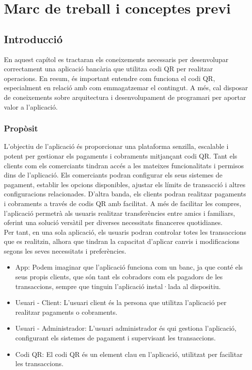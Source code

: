 \documentclass[a4paper,12pt,twoside]{ThesisStyle}
\begin{document}
\chapter{Marc de treball i conceptes previ}
\label{chp:marcdetreball}


\section{Introducció}
\label{subsec:Introducció}

En aquest capítol es tractaran els coneixements necessaris per desenvolupar correctament una aplicació bancària que utilitza codi QR per realitzar operacions. En resum, és important entendre com funciona el codi QR, especialment en relació amb com emmagatzemar el contingut. A més, cal disposar de coneixements sobre arquitectura i desenvolupament de programari per aportar valor a l'aplicació.

\subsection{Propòsit}
\label{subsec: Propòsit}

L'objectiu de l'aplicació és proporcionar una plataforma senzilla, escalable i potent per gestionar els pagaments i cobraments mitjançant codi QR. Tant els clients com els comerciants tindran accés a les mateixes funcionalitats i permisos dins de l'aplicació. Els comerciants podran configurar els seus sistemes de pagament, establir les opcions disponibles, ajustar els límits de transacció i altres configuracions relacionades. D'altra banda, els clients podran realitzar pagaments i cobraments a través de codis QR amb facilitat. A més de facilitar les compres, l'aplicació permetrà als usuaris realitzar transferències entre amics i familiars, oferint una solució versàtil per diverses necessitats financeres quotidianes.\\


Per tant, en una sola aplicació, els usuaris podran controlar totes les transaccions que es realitzin, alhora que tindran la capacitat d'aplicar canvis i modificacions segons les seves necessitats i preferències.




\begin{itemize}
    \item App: Podem imaginar que l'aplicació funciona com un banc, ja que conté els seus propis clients, que són tant els cobradors com els pagadors de les transaccions, sempre que tinguin l'aplicació instal·lada al dispositiu.
    \item Usuari - Client: L'usuari client és la persona que utilitza l'aplicació per realitzar pagaments o cobraments.
    \item Usuari - Administrador: L'usuari administrador és qui gestiona l'aplicació, configurant els sistemes de pagament i supervisant les transaccions.
    \item Codi QR: El codi QR és un element clau en l'aplicació, utilitzat per facilitar les transaccions.

\end{itemize}
\end{document}
